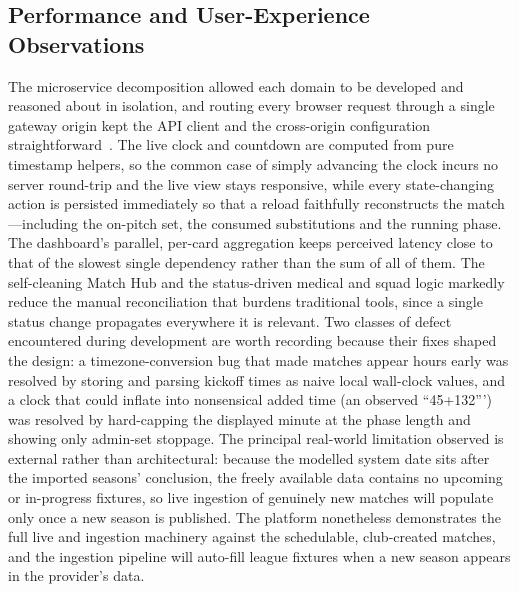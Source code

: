 \subsection{Performance and User-Experience Observations}
The microservice decomposition allowed each domain to be developed and reasoned about in isolation, and routing every browser
request through a single gateway origin kept the API client and the cross-origin configuration straightforward~\cite{microservices,restapi}.
The live clock and countdown are computed from pure timestamp helpers, so the common case of simply advancing the clock incurs no
server round-trip and the live view stays responsive, while every state-changing action is persisted immediately so that a reload
faithfully reconstructs the match---including the on-pitch set, the consumed substitutions and the running phase. The dashboard's
parallel, per-card aggregation keeps perceived latency close to that of the slowest single dependency rather than the sum of all
of them. The self-cleaning Match Hub and the status-driven medical and squad logic markedly reduce the manual reconciliation that
burdens traditional tools, since a single status change propagates everywhere it is relevant. Two classes of defect encountered
during development are worth recording because their fixes shaped the design: a timezone-conversion bug that made matches appear
hours early was resolved by storing and parsing kickoff times as naive local wall-clock values, and a clock that could inflate into
nonsensical added time (an observed ``45+132''') was resolved by hard-capping the displayed minute at the phase length and showing
only admin-set stoppage. The principal real-world limitation observed is external rather than architectural: because the modelled
system date sits after the imported seasons' conclusion, the freely available data contains no upcoming or in-progress fixtures, so
live ingestion of genuinely new matches will populate only once a new season is published. The platform nonetheless demonstrates the
full live and ingestion machinery against the schedulable, club-created matches, and the ingestion pipeline will auto-fill league
fixtures when a new season appears in the provider's data.

